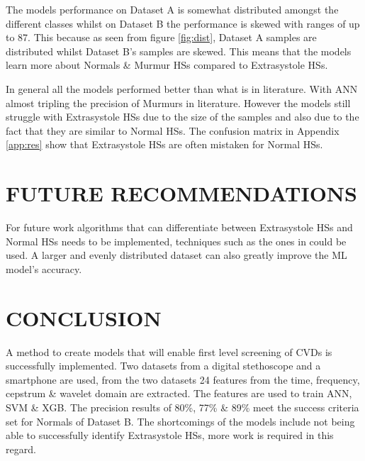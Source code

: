\documentclass[10pt,twocolumn]{witseiepaper}
\begin{document}
The models performance on Dataset A is somewhat distributed amongst the different classes whilst on Dataset B the performance is skewed with ranges of up to 87. This because as seen from figure \ref{fig:dist}, Dataset A samples are distributed whilst Dataset B's samples are skewed. This means that the models learn more about Normals \& Murmur HSs compared to Extrasystole HSs.

In general all the models performed better than what is in literature.  With ANN almost tripling the precision of Murmurs in literature. However the models still struggle with Extrasystole HSs due to the size of the samples and also due to the fact that they are similar to Normal HSs. The confusion matrix in Appendix \ref{app:res} show that Extrasystole HSs are often mistaken for Normal HSs.

\section{FUTURE RECOMMENDATIONS}
For future work algorithms that can differentiate between Extrasystole HSs and Normal HSs needs to be implemented, techniques such as the ones in \cite{17} could be used. A larger and evenly distributed dataset can also greatly improve the ML model's accuracy. 

\section{CONCLUSION}
A method to create models that will enable first level screening of CVDs is successfully implemented. Two datasets from a digital stethoscope and a smartphone are used, from the two datasets 24 features from the time, frequency, cepstrum \& wavelet domain are extracted. The features are used to train ANN, SVM \& XGB. The precision results  of 80\%, 77\% \& 89\% meet the success criteria set for Normals of Dataset B. The shortcomings of the models include not being able to successfully identify Extrasystole HSs, more work is required in this regard. 



%




\end{document}

